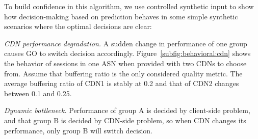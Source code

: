 

To build confidence in this algorithm, we use controlled synthetic input to show how decision-making based on prediction behaves in some simple synthetic scenarios where the optimal decisions are clear:
\begin{packedenumerate}
  \item {\it CDN performance degradation.} A sudden change in performance of one group causes GO to switch decision accordingly. Figure~\ref{subfig:behavioral:cdn} shows the behavior of sessions in one ASN when provided with two CDNs to choose from. Assume that buffering ratio is the only considered quality metric. The average buffering ratio of CDN1 is stably at 0.2 and that of CDN2 changes between 0.1 and 0.25.
  \item {\it Dynamic bottleneck.} Performance of group A is decided by client-side problem, and that group B is decided by CDN-side problem, so when CDN changes its performance, only group B will switch decision.
\end{packedenumerate}

\begin{figure}[t!]
\centering
{}
\label{fig:behavioral}
\end{figure}


